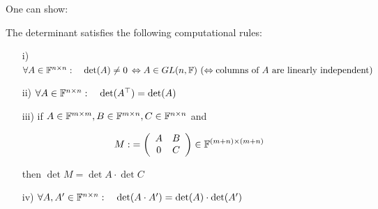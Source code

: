 \begin{frame}
	\vspace{0.2cm}
	\vspace{0.99cm}
	One can show:\vspace{-0.2cm}
	\begin{theorem}\label{theo:det-rules} The determinant satisfies the following computational rules:
		\begin{itemize}		
		\vspace{0.2cm}\item[i)] $\forall  A \in {\mathbb{F}}^{n \times n}:~~~\det(A)\neq 0\, \Leftrightarrow A\in GL(n,{\mathbb{F}} ) ~(\Leftrightarrow \text{columns of $A$ are linearly independent})$
		\vspace{0.2cm}\item[ii)] $\forall  A \in {\mathbb{F}}^{n \times n}:~~~\det(A^\top)=\det(A)$
		\vspace{0.2cm}\item[iii)] if 
		$ A \in {\mathbb{F}}^{m \times m}, 
		B \in {\mathbb{F}}^{m \times n}, 
		C \in {\mathbb{F}}^{n \times n}$ 
		and
		
		\begin{equation*}
		M : \; = 
		\left(
		\begin {array} {c c} 
		A & B \\ 
		0 & C 
		\end {array} 
		\right)
		\in {\mathbb{F}}^{(m + n) \times (m + n)}
		\end{equation*}
		
		then
		$ \det M = 
		\det A \cdot \det C $
		
		\vspace{0.2cm}\item[iv)] $\forall A,A' \in {\mathbb{F}}^{n \times n}:~~~\det(A\cdot A')=\det(A)\cdot\det(A')$
	\end{itemize}
	\end{theorem}
	~\\~\\
\end{frame}

